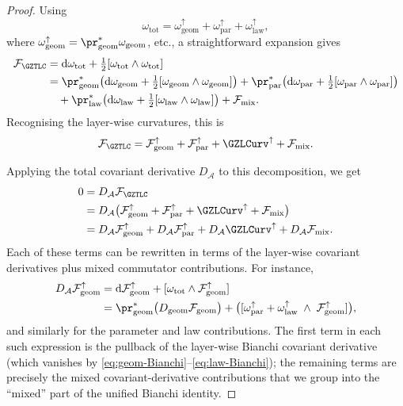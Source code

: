 \documentclass[11pt]{book}
\theoremstyle{plain}
\theoremstyle{definition}
\begin{document}
\begin{proof}
Using
\[
  \omega_{\mathrm{tot}}
  =
  \omega_{\mathrm{geom}}^{\uparrow}
  +
  \omega_{\mathrm{par}}^{\uparrow}
  +
  \omega_{\mathrm{law}}^{\uparrow},
\]
where \(\omega_{\mathrm{geom}}^{\uparrow}=\pr_{\mathrm{geom}}^*\omega_{\mathrm{geom}}\),
etc., a straightforward expansion gives
\begin{align*}
  \mathcal{F}_{\GZTLC}
  &= \mathrm{d}\omega_{\mathrm{tot}}
     + \tfrac12[\omega_{\mathrm{tot}}\wedge\omega_{\mathrm{tot}}] \\
  &= \pr_{\mathrm{geom}}^*\bigl(
       \mathrm{d}\omega_{\mathrm{geom}}
       + \tfrac12[\omega_{\mathrm{geom}}\wedge\omega_{\mathrm{geom}}]
     \bigr)
    +
     \pr_{\mathrm{par}}^*\bigl(
       \mathrm{d}\omega_{\mathrm{par}}
       + \tfrac12[\omega_{\mathrm{par}}\wedge\omega_{\mathrm{par}}]
     \bigr) \\
  &\quad
    +
    \pr_{\mathrm{law}}^*\bigl(
       \mathrm{d}\omega_{\mathrm{law}}
       + \tfrac12[\omega_{\mathrm{law}}\wedge\omega_{\mathrm{law}}]
     \bigr)
    +
    \mathcal{F}_{\mathrm{mix}}.
\end{align*}
Recognising the layer-wise curvatures, this is
\[
  \mathcal{F}_{\GZTLC}
  =
  \mathcal{F}_{\mathrm{geom}}^{\uparrow}
  +
  \mathcal{F}_{\mathrm{par}}^{\uparrow}
  +
  \GZLCurv^{\uparrow}
  +
  \mathcal{F}_{\mathrm{mix}}.
\]

Applying the total covariant derivative \(D_{\mathcal{A}}\) to this
decomposition, we get
\begin{align*}
  0
  &= D_{\mathcal{A}}\mathcal{F}_{\GZTLC} \\
  &= D_{\mathcal{A}}\bigl(
       \mathcal{F}_{\mathrm{geom}}^{\uparrow}
       +
       \mathcal{F}_{\mathrm{par}}^{\uparrow}
       +
       \GZLCurv^{\uparrow}
       +
       \mathcal{F}_{\mathrm{mix}}
     \bigr) \\
  &= D_{\mathcal{A}}\mathcal{F}_{\mathrm{geom}}^{\uparrow}
     +
     D_{\mathcal{A}}\mathcal{F}_{\mathrm{par}}^{\uparrow}
     +
     D_{\mathcal{A}}\GZLCurv^{\uparrow}
     +
     D_{\mathcal{A}}\mathcal{F}_{\mathrm{mix}}.
\end{align*}
Each of these terms can be rewritten in terms of the layer-wise
covariant derivatives plus mixed commutator contributions.  For
instance,
\begin{align*}
  D_{\mathcal{A}}\mathcal{F}_{\mathrm{geom}}^{\uparrow}
  &= \mathrm{d}\mathcal{F}_{\mathrm{geom}}^{\uparrow}
     +
     [\omega_{\mathrm{tot}}\wedge\mathcal{F}_{\mathrm{geom}}^{\uparrow}] \\
  &= \pr_{\mathrm{geom}}^*\bigl(
       D_{\mathrm{geom}}\mathcal{F}_{\mathrm{geom}}
     \bigr)
     +
     \bigl([\omega_{\mathrm{par}}^{\uparrow}
            + \omega_{\mathrm{law}}^{\uparrow}
            \;\wedge\;
            \mathcal{F}_{\mathrm{geom}}^{\uparrow}]\bigr),
\end{align*}
and similarly for the parameter and law contributions.  The first term
in each such expression is the pullback of the layer-wise Bianchi
covariant derivative (which vanishes by
\eqref{eq:geom-Bianchi}–\eqref{eq:law-Bianchi}); the remaining terms
are precisely the mixed covariant-derivative contributions that we
group into the ``mixed'' part of the unified Bianchi identity.


\end{proof}
\end{document}
